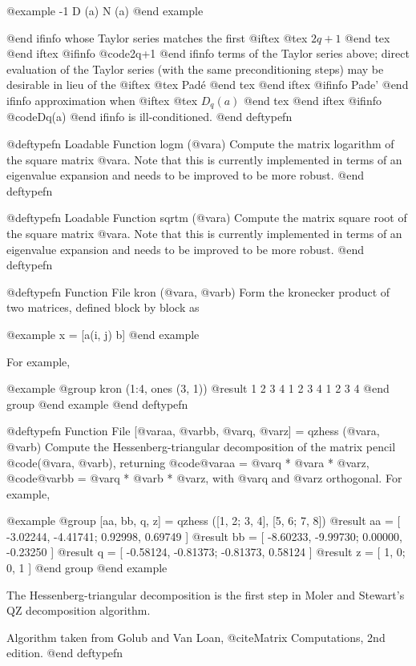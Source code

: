 @example
     -1
D (a)   N (a)
@end example

@end ifinfo
 whose Taylor series matches the first
@iftex
@tex
$2 q + 1 $
@end tex
@end iftex
@ifinfo
@code{2q+1}
@end ifinfo
terms of the Taylor series above; direct evaluation of the Taylor series
(with the same preconditioning steps) may be desirable in lieu of the
@iftex
@tex
Pad\'e
@end tex
@end iftex
@ifinfo
Pade'
@end ifinfo
approximation when
@iftex
@tex
$D_q(a)$
@end tex
@end iftex
@ifinfo
@code{Dq(a)}
@end ifinfo
is ill-conditioned.
@end deftypefn

@deftypefn {Loadable Function} {} logm (@var{a})
Compute the matrix logarithm of the square matrix @var{a}.  Note that
this is currently implemented in terms of an eigenvalue expansion and
needs to be improved to be more robust.
@end deftypefn

@deftypefn {Loadable Function} {} sqrtm (@var{a})
Compute the matrix square root of the square matrix @var{a}.  Note that
this is currently implemented in terms of an eigenvalue expansion and
needs to be improved to be more robust.
@end deftypefn

@deftypefn {Function File} {} kron (@var{a}, @var{b})
Form the kronecker product of two matrices, defined block by block as

@example
x = [a(i, j) b]
@end example

For example,

@example
@group
kron (1:4, ones (3, 1))
     @result{}  1  2  3  4
         1  2  3  4
         1  2  3  4
@end group
@end example
@end deftypefn

@deftypefn {Function File} {[@var{aa}, @var{bb}, @var{q}, @var{z}] =} qzhess (@var{a}, @var{b})
Compute the Hessenberg-triangular decomposition of the matrix pencil
@code{(@var{a}, @var{b})}, returning
@code{@var{aa} = @var{q} * @var{a} * @var{z}}, 
@code{@var{bb} = @var{q} * @var{b} * @var{z}}, with @var{q} and @var{z}
orthogonal.  For example,

@example
@group
[aa, bb, q, z] = qzhess ([1, 2; 3, 4], [5, 6; 7, 8])
     @result{} aa = [ -3.02244, -4.41741;  0.92998,  0.69749 ]
     @result{} bb = [ -8.60233, -9.99730;  0.00000, -0.23250 ]
     @result{}  q = [ -0.58124, -0.81373; -0.81373,  0.58124 ]
     @result{}  z = [ 1, 0; 0, 1 ]
@end group
@end example

The Hessenberg-triangular decomposition is the first step in
Moler and Stewart's QZ decomposition algorithm.

Algorithm taken from Golub and Van Loan, @cite{Matrix Computations, 2nd
edition}.
@end deftypefn

